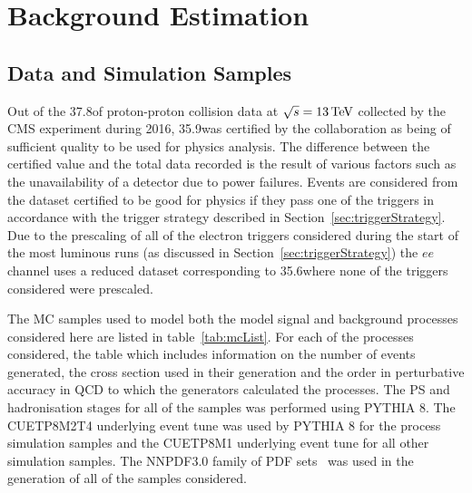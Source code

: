 \chapter{Background Estimation}\label{chapter:bkg}
%
%
%
%

\section{Data and Simulation Samples}\label{sec:samples}
Out of the 37.8\fbinv of  proton-proton collision data at $\sqrt{s} = 13\,\text{Te\hspace{-.08em}V}$ collected by the CMS experiment during 2016, 35.9\fbinv was certified by the collaboration as being of sufficient quality to be used for physics analysis.
The difference between the certified value and the total data recorded is the result of various factors such as the unavailability of a detector due to power failures.
Events are considered from the dataset certified to be good for physics if they pass one of the triggers in accordance with the trigger strategy described in Section~\ref{sec:triggerStrategy}.
Due to the prescaling of all of the electron triggers considered during the start of the most luminous runs (as discussed in Section~\ref{sec:triggerStrategy}) the $ee$ channel uses a reduced dataset corresponding to 35.6\fbinv where none of the triggers considered were prescaled.

The MC samples used to model both the model signal and background processes considered here are listed in table~\ref{tab:mcList}.
For each of the processes considered, the table which includes information on the number of events generated, the cross section used in their generation and the order in perturbative accuracy in QCD to which the generators calculated the processes.
The PS and hadronisation stages for all of the samples was performed using PYTHIA 8.
The CUETP8M2T4 underlying event tune was used by PYTHIA 8 for the \ttbar process simulation samples and the CUETP8M1 underlying event tune for all other simulation samples.
The NNPDF3.0 family of PDF sets~\cite{Ball:2012cx} was used in the generation of all of the samples considered.


